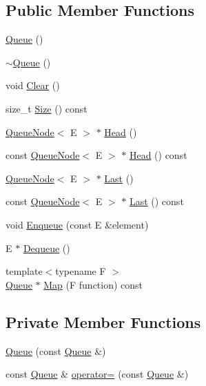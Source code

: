 \subsection*{Public Member Functions}
\begin{DoxyCompactItemize}
\item 
\hyperlink{classQueue_ab09891e54b51dc677ee6efb350687ae4}{Queue} ()
\item 
\hyperlink{classQueue_a49fe82adb8dc2fb62ab53876a6933d0f}{$\sim$\+Queue} ()
\item 
void \hyperlink{classQueue_acfdd5f9f7e936ca30dcf877370ef9510}{Clear} ()
\item 
size\+\_\+t \hyperlink{classQueue_abc4d78b5f66041011c5590bf703847b0}{Size} () const
\item 
\hyperlink{classQueueNode}{Queue\+Node}$<$ E $>$ $\ast$ \hyperlink{classQueue_a71aa0154ef75bb87a53b6af1829fcd5e}{Head} ()
\item 
const \hyperlink{classQueueNode}{Queue\+Node}$<$ E $>$ $\ast$ \hyperlink{classQueue_a6c906075e0ad2d1f0634990aa106395e}{Head} () const
\item 
\hyperlink{classQueueNode}{Queue\+Node}$<$ E $>$ $\ast$ \hyperlink{classQueue_a430aca3d3b9f5fd588b215028d134b74}{Last} ()
\item 
const \hyperlink{classQueueNode}{Queue\+Node}$<$ E $>$ $\ast$ \hyperlink{classQueue_a7c8c2c64700dfe1df8bf266572cf101a}{Last} () const
\item 
void \hyperlink{classQueue_abaa2e7175457307bca74f5562cbdaaa9}{Enqueue} (const E \&element)
\item 
E $\ast$ \hyperlink{classQueue_a434d465001c3078e999f7a89a8af84c0}{Dequeue} ()
\item 
{\footnotesize template$<$typename F $>$ }\\\hyperlink{classQueue}{Queue} $\ast$ \hyperlink{classQueue_a904a696292fc593adc6fd21fb229d760}{Map} (F function) const
\end{DoxyCompactItemize}
\subsection*{Private Member Functions}
\begin{DoxyCompactItemize}
\item 
\hyperlink{classQueue_ac071ee553005a67737d35edeeaafca5b}{Queue} (const \hyperlink{classQueue}{Queue} \&)
\item 
const \hyperlink{classQueue}{Queue} \& \hyperlink{classQueue_adf6f3eb046365f1b67b6c0bd5da2da59}{operator=} (const \hyperlink{classQueue}{Queue} \&)
\end{DoxyCompactItemize}
